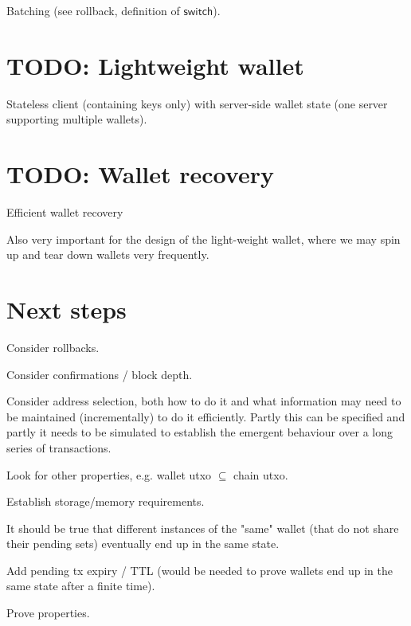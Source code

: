 \documentclass{article}
\begin{document}
Batching (see rollback, definition of $\mathsf{switch}$).

\section{TODO: Lightweight wallet}

Stateless client (containing keys only) with server-side wallet state
(one server supporting multiple wallets).

\section{TODO: Wallet recovery}

Efficient wallet recovery

Also very important for the design of the light-weight wallet, where we may
spin up and tear down wallets very frequently.

\section{Next steps}

Consider rollbacks.

Consider confirmations / block depth.

Consider address selection, both how to do it and what information may need to
be maintained (incrementally) to do it efficiently. Partly this can be specified
and partly it needs to be simulated to establish the emergent behaviour over a
long series of transactions.

Look for other properties, e.g. wallet utxo $\subseteq$ chain utxo.

Establish storage/memory requirements.

It should be true that different instances of the "same" wallet (that do not share their pending sets) eventually end up in the same state.

Add pending tx expiry / TTL (would be needed to prove wallets end up in the same state after a finite time).

Prove properties.



\end{document}
